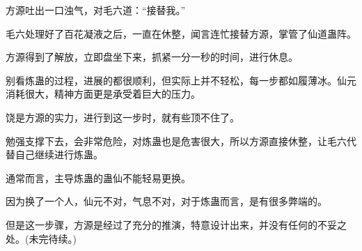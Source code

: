 \begin{this_body}
方源吐出一口浊气，对毛六道：“接替我。”

毛六处理好了百花凝液之后，一直在休整，闻言连忙接替方源，掌管了仙道蛊阵。

方源得到了解放，立即盘坐下来，抓紧一分一秒的时间，进行休息。

别看炼蛊的过程，进展的都很顺利，但实际上并不轻松，每一步都如履薄冰。仙元消耗很大，精神方面更是承受着巨大的压力。

饶是方源的实力，进行到这一步时，就有些顶不住了。

勉强支撑下去，会非常危险，对炼蛊也是危害很大，所以方源直接休整，让毛六代替自己继续进行炼蛊。

通常而言，主导炼蛊的蛊仙不能轻易更换。

因为换了一个人，仙元不对，气息不对，对于炼蛊而言，是有很多弊端的。

但是这一步骤，方源是经过了充分的推演，特意设计出来，并没有任何的不妥之处。(未完待续。)

\end{this_body}

